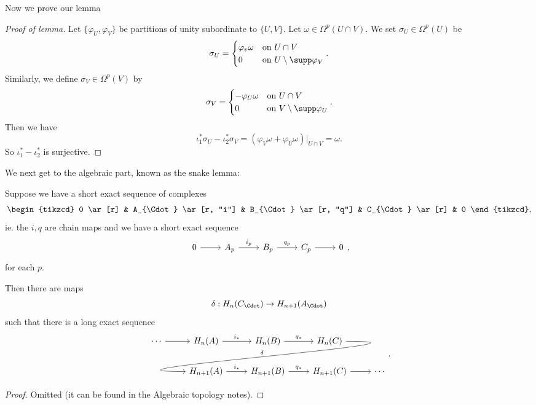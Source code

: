 \documentclass[a4paper]{article}
\begin{document}
Now we prove our lemma
\begin{proof}[Proof of lemma]
  Let $\{\varphi_U, \varphi_V\}$ be partitions of unity subordinate to $\{U, V\}$. Let $\omega \in \Omega^p(U \cap V)$. We set $\sigma_U \in \Omega^p(U)$ be
  \[
    \sigma_U =
    \begin{cases}
      \varphi_v \omega & \text{on }U \cap V\\
      0 & \text{on }U \setminus \supp \varphi_V
    \end{cases}.
  \]
  Similarly, we define $\sigma_V \in \Omega^p(V)$ by
  \[
    \sigma_V =
    \begin{cases}
      -\varphi_U \omega & \text{on }U \cap V\\
      0 & \text{on }V \setminus \supp \varphi_U
    \end{cases}.
  \]
  Then we have
  \[
    \iota_1^* \sigma_U - \iota_2^* \sigma_V = (\varphi_V \omega + \varphi_U \omega)|_{U \cap V} = \omega.
  \]
  So $\iota_1^* - \iota_2^*$ is surjective.
\end{proof}

We next get to the algebraic part, known as the snake lemma:
\begin{thm}
  Suppose we have a short exact sequence of complexes
  \[
    \begin{tikzcd}
      0 \ar[r] & A_{\Cdot} \ar [r, "i"] & B_{\Cdot} \ar [r, "q"] & C_{\Cdot} \ar[r] & 0
    \end{tikzcd},
  \]
  ie. the $i, q$ are chain maps and we have a short exact sequence
  \[
    \begin{tikzcd}
      0 \ar[r] & A_p \ar [r, "i_p"] & B_p \ar [r, "q_p"] & C_p \ar[r] & 0
    \end{tikzcd},
  \]
  for each $p$.

  Then there are maps
  \[
    \delta: H_n(C_{\Cdot}) \to H_{n + 1}(A_{\Cdot})
  \]
  such that there is a long exact sequence
  \[
    \begin{tikzcd}
      \cdots \ar [r] & H_n(A) \ar[r, "i_*"] & H_n(B) \ar[r, "q_*"] & H_n(C) \ar[out=0, in=180, looseness=2, overlay, dll, "\delta"']\\
      & H_{n + 1}(A) \ar[r, "i_*"] & H_{n + 1}(B) \ar[r, "q_*"] & H_{n + 1}(C) \ar [r] & \cdots
    \end{tikzcd}.
  \]
\end{thm}

\begin{proof}
  Omitted (it can be found in the Algebraic topology notes). %
\end{proof}
\end{document}
